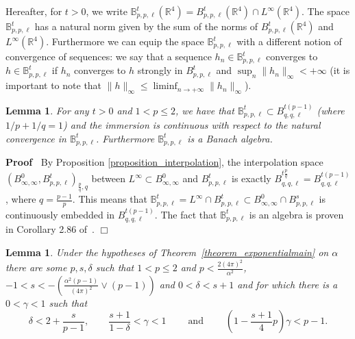 \documentclass[a4paper,10pt]{article}
\newcommand{\tmop}[1]{\ensuremath{\operatorname{#1}}}
\newenvironment{proof}{\noindent\textbf{Proof\ }}{\hspace*{\fill}$\Box$\medskip}
\newtheorem{lemma}[theorem]{Lemma}
\begin{document}
Hereafter, for $t > 0$, we write $\mathbb{B}^t_{p, p, \ell} (\mathbb{R}^4) =
B^t_{p, p, \ell} (\mathbb{R}^4) \cap L^{\infty} (\mathbb{R}^4)$. The space
$\mathbb{B}^t_{p, p, \ell}$ has a natural norm given by the sum of the norms
of $B^t_{p, p, \ell} (\mathbb{R}^4)$ and $L^{\infty} (\mathbb{R}^4)$.
Furthermore we can equip the space $\mathbb{B}^t_{p, p, \ell}$ with a
different notion of convergence of sequences: we say that a sequence $h_n \in
\mathbb{B}^t_{p, p, \ell}$ converges to $h \in \mathbb{B}^t_{p, p, \ell}$ if
$h_n$ converges to $h$ strongly in $B^t_{p, p, \ell}$ and $\sup_n \| h_n
\|_{\infty} < + \infty$ (it is important to note that $\| h \|_{\infty}
\leqslant \liminf_{n \rightarrow + \infty} \| h_n \|_{\infty}$).

\begin{lemma}
  \label{lemma_interpolation}For any $t > 0$ and $1 < p \leqslant 2$, we have
  that $\mathbb{B}^t_{p, p, \ell} \subset B^{t (p - 1)}_{q, q, \ell}$ (where
  $1 / p + 1 / q = 1$) and the immersion is continuous with respect to the
  natural convergence in $\mathbb{B}^t_{p, p, \ell}$. Furthermore
  $\mathbb{B}^t_{p, p, \ell}$ is a Banach algebra.
\end{lemma}

\begin{proof}
  By Proposition \ref{proposition_interpolation}, the interpolation space
  $(B^0_{\infty, \infty}, B^t_{p, p, \ell})_{\frac{p}{q}, q}$ between
  $L^{\infty} \subset B^0_{\infty, \infty}$ and $B^t_{p, p, \ell}$ is exactly
  $B^{t \frac{p}{q}}_{q, q, \ell} = B^{t (p - 1)}_{q, q, \ell}$, where $q =
  \frac{p - 1}{p}$. This means that $\mathbb{B}^t_{p, p, \ell} = L^{\infty}
  \cap B^t_{p, p, \ell} \subset B^0_{\infty, \infty} \cap B^s_{p, p, \ell}$ is
  continuously embedded in $B^{t (p - 1)}_{q, q, \ell}$. The fact that
  $\mathbb{B}_{p, p, \ell}^t$ is an algebra is proven in Corollary 2.86
  of~{\cite{Bahouri2011}}.
\end{proof}

\begin{lemma}
  \label{lemma_gamma}Under the hypotheses of
  Theorem~\ref{theorem_exponentialmain} on $\alpha$ there are some $p, s,
  \delta$ such that $1 < p \leqslant 2$ and $p < \frac{2 (4
  \pi)^2}{\alpha^2}$, $- 1 < s < - \left( \frac{\alpha^2 (p - 1)}{(4 \pi)^2}
  \vee (p - 1) \right)$ and $0 < \delta < s + 1$ and for which there is a $0 <
  \gamma < 1$ such that
  \begin{equation}
    \delta < 2 + \frac{s}{p - 1}, \qquad \frac{s + 1}{1 - \delta} < \gamma < 1
    \qquad \tmop{and} \qquad \left( 1 - \frac{s + 1}{4} p \right) \gamma < p -
    1. \label{eq:gamma}
  \end{equation}
\end{lemma}
\end{document}
